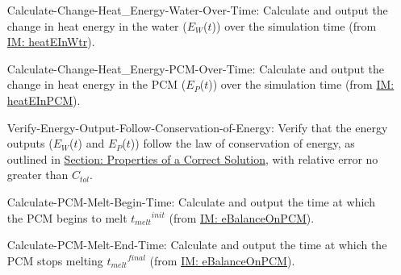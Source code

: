 \documentclass[12pt]{article}
\begin{document}
\begin{itemize}
\item[Calculate-Change-Heat\_Energy-Water-Over-Time:\phantomsection\label{calcChgHeatEnergyWtrOverTime}]Calculate and output the change in heat energy in the water (${E_{W}}$($t$)) over the simulation time (from \hyperref[IM:heatEInWtr]{IM: heatEInWtr}).
\item[Calculate-Change-Heat\_Energy-PCM-Over-Time:\phantomsection\label{calcChgHeatEnergyPCMOverTime}]Calculate and output the change in heat energy in the PCM (${E_{P}}$($t$)) over the simulation time (from \hyperref[IM:heatEInPCM]{IM: heatEInPCM}).
\item[Verify-Energy-Output-Follow-Conservation-of-Energy:\phantomsection\label{verifyEnergyOutput}]Verify that the energy outputs (${E_{W}}$($t$) and ${E_{P}}$($t$)) follow the law of conservation of energy, as outlined in \hyperref[Sec:CorSolProps]{Section: Properties of a Correct Solution}, with relative error no greater than ${C_{tol}}$.
\item[Calculate-PCM-Melt-Begin-Time:\phantomsection\label{calcPCMMeltBegin}]Calculate and output the time at which the PCM begins to melt ${{t_{melt}}^{init}}$ (from \hyperref[IM:eBalanceOnPCM]{IM: eBalanceOnPCM}).
\item[Calculate-PCM-Melt-End-Time:\phantomsection\label{calcPCMMeltEnd}]Calculate and output the time at which the PCM stops melting ${{t_{melt}}^{final}}$ (from \hyperref[IM:eBalanceOnPCM]{IM: eBalanceOnPCM}).
\end{itemize}
\end{document}
